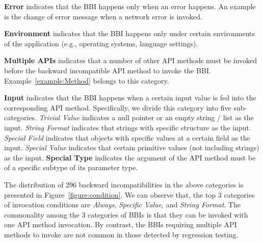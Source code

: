 \textbf{Error} indicates that the BBI happens only when an error happens. An example is the change of error message when a network error is invoked. 

\textbf{Environment} indicates that the BBI happens only under certain environments of the application (e.g., operating systems, language settings). 

\textbf{Multiple APIs} indicates that a number of other API methods must be invoked before the backward incompatible API method to invoke the BBI. Example~\ref{example:Method} belongs to this category. 

\textbf{Input} indicates that the BBI happens when a certain input value is fed into the corresponding API method. Specifically, we divide this category into five sub-categories. \textit{Trivial Value} indicates a null pointer or an empty string / list as the input. \textit{String Format} indicates that strings with specific structure as the input. \textit{Special Field} indicates that objects with specific values at a certain field as the input. \textit{Special Value} indicates that certain primitive values (not including strings) as the input. \textbf{Special Type} indicates the argument of the API method must be of a specific subtype of its parameter type.

The distribution of 296 backward incompatibilities in the above categories is presented in Figure~\ref{figure:condition}. We can observe that, the top 3 categories of invocation conditions are \textit{Always}, \textit{Specific Value}, and \textit{String Format}. The commonality among the 3 categories of BBIs is that they can be invoked with one API method invocation. By contrast, the BBIs requiring multiple API methods to invoke are not common in those detected by regression testing. 








